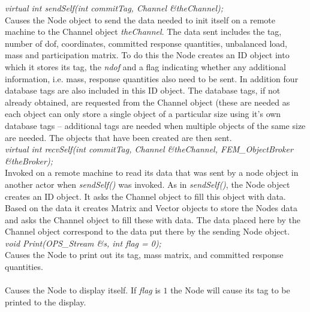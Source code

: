 {\em virtual int sendSelf(int commitTag, Channel \&theChannel);} \\
Causes the Node object to send the data needed to init itself on a
remote machine to the Channel object {\em theChannel}. 
The data sent includes the tag, number of dof, coordinates, committed
response quantities, unbalanced load, mass and participation matrix. 
To do this the Node creates an ID object into which it stores its tag,
the {\em ndof} and a flag indicating whether any additional
information, i.e. mass, response quantities also need to be sent. In
addition four database tags are also included in this ID object. The
database tags, if not already obtained, are requested from the Channel
object (these are needed as each object can only store a single object
of a particular size using it's own database tags -- additional tags
are needed when multiple objects of the same size are needed.
The objects that have been created are then sent. \\

{\em virtual int recvSelf(int commitTag, Channel \&theChannel,
FEM\_ObjectBroker \&theBroker);} \\ 
Invoked on a remote machine to read its data that was sent by a node
object in another actor when {\em sendSelf()} was invoked. As in {\em
sendSelf()}, the Node object creates an ID object. It asks the Channel
object to fill this object with data. Based on the data it creates
Matrix and Vector objects to store the Nodes data and asks the Channel
object to fill these with data. The data placed here by the Channel
object correspond to the data put there by the sending Node object.\\


{\em void Print(OPS_Stream \&s, int flag = 0);} \\
Causes the Node to print out its tag, mass matrix, and committed
response quantities. \\ 

 \\
Causes the Node to display itself. If {\em flag} is $1$ the Node will
cause its tag to be printed to the display. 



